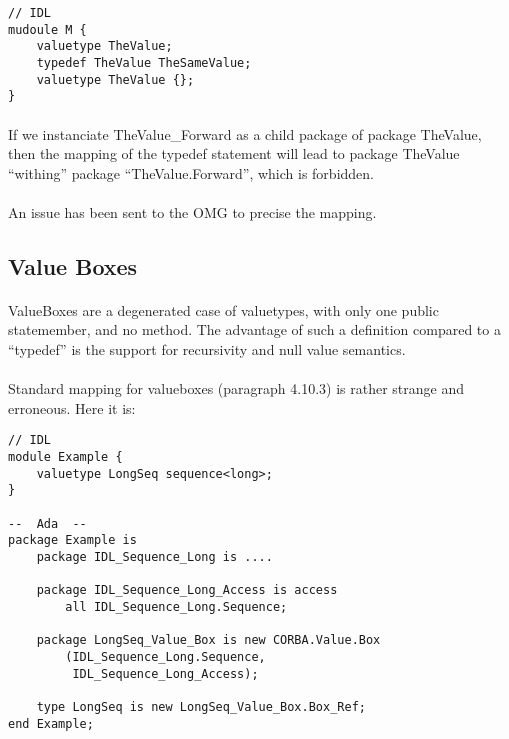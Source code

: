 \begin{verbatim}
// IDL
mudoule M {
	valuetype TheValue;
	typedef TheValue TheSameValue;
	valuetype TheValue {};
}
\end{verbatim}

\paragraph{}If we instanciate TheValue\_Forward as a child package of
package TheValue, then the mapping of the typedef statement will lead
to package TheValue ``withing'' package ``TheValue.Forward'', which is forbidden.

\paragraph{}An issue has been sent to the OMG to precise the mapping.

\subsection{Value Boxes}

\paragraph{} ValueBoxes are a degenerated case of valuetypes, with
only one public statemember, and no method. The advantage of such a
definition compared to a ``typedef'' is the support for recursivity
and null value semantics.

\paragraph{}Standard mapping for valueboxes (paragraph 4.10.3) is rather strange and
erroneous. Here it is:

\begin{verbatim}
// IDL
module Example {
	valuetype LongSeq sequence<long>;
}

--  Ada  --
package Example is
	package IDL_Sequence_Long is ....

	package IDL_Sequence_Long_Access is access
		all IDL_Sequence_Long.Sequence;

	package LongSeq_Value_Box is new CORBA.Value.Box
		(IDL_Sequence_Long.Sequence,
		 IDL_Sequence_Long_Access);

	type LongSeq is new LongSeq_Value_Box.Box_Ref;
end Example;
\end{verbatim}

